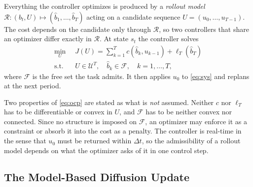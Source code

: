 \documentclass[letterpaper,10pt,conference]{ieeeconf}
\begin{document}
Everything the controller optimizes is produced by a \emph{rollout model} $\mathcal{R}: (b_t, U) \mapsto (\hat{b}_1, \dots, \hat{b}_T)$ acting on a candidate sequence $U = (u_0, \dots, u_{T-1})$.
The cost depends on the candidate only through $\mathcal{R}$, so two controllers that share an optimizer differ exactly in $\mathcal{R}$.
At state $s_t$ the controller solves
\begin{equation}
\begin{aligned}
\min_{U} \;\; & J(U) = \sum_{k=1}^{T} c(\hat{b}_k, u_{k-1}) + \ell_T(\hat{b}_T) \\
\text{s.t.} \;\; & U \in \mathcal{U}^{T}, \quad \hat{b}_k \in \mathcal{F}, \quad k = 1, \dots, T ,
\end{aligned}
\label{eq:ocp}
\end{equation}
where $\mathcal{F}$ is the free set the task admits.
It then applies $u_0$ to \eqref{eq:sys} and replans at the next period.

Two properties of \eqref{eq:ocp} are stated as what is \emph{not} assumed.
Neither $c$ nor $\ell_T$ has to be differentiable or convex in $U$, and $\mathcal{F}$ has to be neither convex nor connected.
Since no structure is imposed on $\mathcal{F}$, an optimizer may enforce it as a constraint or absorb it into the cost as a penalty.
The controller is real-time in the sense that $u_0$ must be returned within $\Delta t$, so the admissibility of a rollout model depends on what the optimizer asks of it in one control step.

\subsection{The Model-Based Diffusion Update}\label{subsec:mbd}
\end{document}
